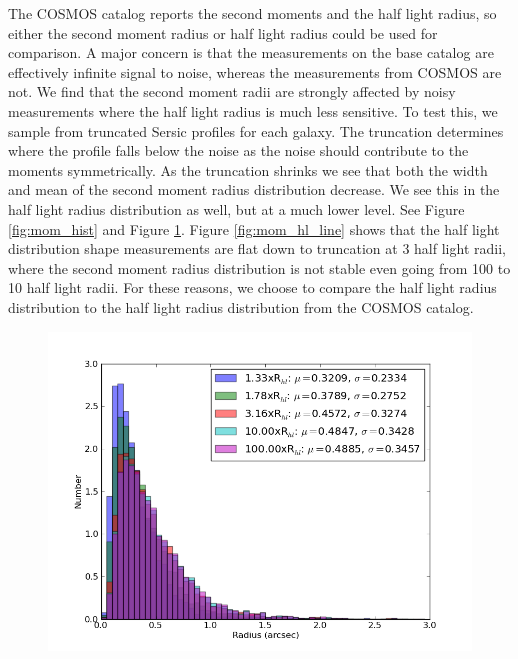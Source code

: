 \documentclass[]{article}
\begin{document}
The COSMOS catalog reports the second moments and the 
half light radius, so either the second moment radius or half light radius could be used for comparison.  A major concern is that the measurements
on the base catalog are effectively infinite signal to noise, whereas the measurements from COSMOS are not.  We find that the second moment 
radii are strongly affected by noisy measurements where the half light radius is much less sensitive.  To test this, we sample from truncated Sersic
profiles for each galaxy.  The truncation determines where the profile falls below the noise as the noise should contribute to the moments symmetrically.
As the truncation shrinks we see that both the width and mean of the second moment radius distribution decrease.  We see this in the
half light radius distribution as well, but at a much lower level.  See Figure \ref{fig:mom_hist} and Figure \ref{fig:hl_hist}.  Figure
\ref{fig:mom_hl_line} shows that the half light distribution shape measurements are flat down to truncation at 3 half light radii, where 
the second moment radius distribution is not stable even going from 100 to 10 half light radii.  For these reasons, we choose to compare the half light 
radius distribution to the half light radius distribution from the COSMOS catalog.
\begin{figure}
\centering
\includegraphics[width=5in]{validation_figures/half_light_hist.png}
\caption{\label{fig:hl_hist}}
\end{figure}
\end{document}
